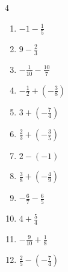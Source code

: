 \begin{multicols}{4}
\begin{enumerate}

  \item $\displaystyle -1 - \frac{1}{5}$


  \item $\displaystyle 9 - \frac{2}{3}$


  \item $\displaystyle -\frac{1}{10} - \frac{10}{7}$


  \item $\displaystyle -\frac{1}{2} + \left(-\frac{3}{8}\right)$


  \item $\displaystyle 3 + \left(-\frac{7}{4}\right)$


  \item $\displaystyle \frac{2}{3} + \left(-\frac{3}{5}\right)$


  \item $\displaystyle 2 - \left(-1\right)$

        \phantom{$\displaystyle =3$}

  \item $\displaystyle \frac{3}{8} + \left(-\frac{4}{9}\right)$


  \item $\displaystyle -\frac{6}{7} - \frac{6}{5}$


\columnbreak %

  \item $\displaystyle 4 + \frac{5}{4}$


  \item $\displaystyle -\frac{9}{10} + \frac{1}{8}$


  \item $\displaystyle \frac{2}{5} - \left(-\frac{7}{4}\right)$


\end{enumerate}
\end{multicols}

